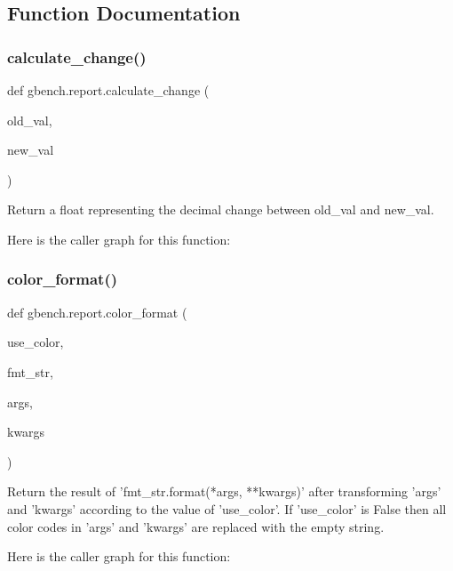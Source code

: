 \subsection{Function Documentation}
\mbox{\label{namespacegbench_1_1report_ab54bf3557c03f4d6cff9508b6f19a04e}} 
\subsubsection{\texorpdfstring{calculate\+\_\+change()}{calculate\_change()}}
{\footnotesize\ttfamily def gbench.\+report.\+calculate\+\_\+change (\begin{DoxyParamCaption}\item[{}]{old\+\_\+val,  }\item[{}]{new\+\_\+val }\end{DoxyParamCaption})}

\begin{DoxyVerb}Return a float representing the decimal change between old_val and new_val.
\end{DoxyVerb}
 Here is the caller graph for this function\+:
\mbox{\label{namespacegbench_1_1report_a4cdf56600b667e70e03df6e3b48c67a7}} 
\subsubsection{\texorpdfstring{color\+\_\+format()}{color\_format()}}
{\footnotesize\ttfamily def gbench.\+report.\+color\+\_\+format (\begin{DoxyParamCaption}\item[{}]{use\+\_\+color,  }\item[{}]{fmt\+\_\+str,  }\item[{}]{args,  }\item[{}]{kwargs }\end{DoxyParamCaption})}

\begin{DoxyVerb}Return the result of 'fmt_str.format(*args, **kwargs)' after transforming
'args' and 'kwargs' according to the value of 'use_color'. If 'use_color'
is False then all color codes in 'args' and 'kwargs' are replaced with
the empty string.
\end{DoxyVerb}
 Here is the caller graph for this function\+:
\mbox{\label{namespacegbench_1_1report_a7e41e0bde62503f68727e532aa0c4000}} 
